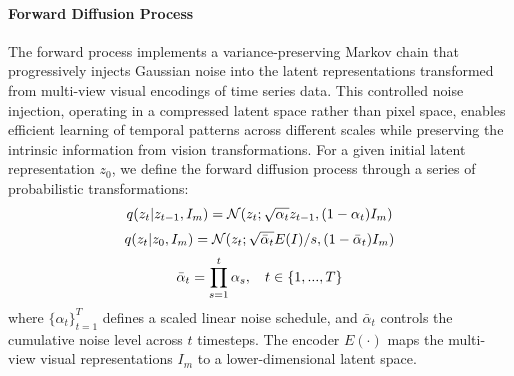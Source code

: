\paragraph{Forward Diffusion Process}
The forward process implements a variance-preserving Markov chain that progressively injects Gaussian noise into the latent representations transformed from multi-view visual encodings of time series data. This controlled noise injection, operating in a compressed latent space rather than pixel space, enables efficient learning of temporal patterns across different scales while preserving the intrinsic information from vision transformations. For a given initial latent representation $z_0$, we define the forward diffusion process through a series of probabilistic transformations:
\begin{equation}
\small
    q(z_t|z_{t-1}, I_m) = \mathcal{N}(z_t; \sqrt{\alpha_t}z_{t-1}, (1-\alpha_t)I_m)
\end{equation}
\begin{equation}
\small
    q(z_t|z_0, I_m) = \mathcal{N}(z_t; \sqrt{\bar{\alpha}_t}E(I)/s, (1-\bar{\alpha}_t)I_m)
\end{equation}
\begin{equation}
\small
    \bar{\alpha}_t = \prod_{s=1}^t \alpha_s, \quad t \in \{1,...,T\}
\end{equation}
where $\{\alpha_t\}_{t=1}^T$ defines a scaled linear noise schedule, and $\bar{\alpha}_t$ controls the cumulative noise level across $t$ timesteps. The encoder $E(\cdot)$ maps the multi-view visual representations $I_m$ to a lower-dimensional latent space. %

